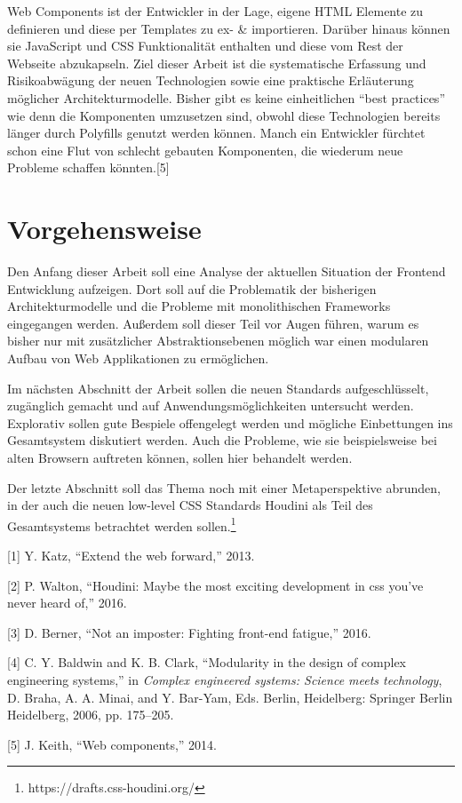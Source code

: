Web Components ist der Entwickler in der Lage, eigene HTML Elemente zu
definieren und diese per Templates zu ex- \& importieren. Darüber hinaus
können sie JavaScript und CSS Funktionalität enthalten und diese vom
Rest der Webseite abzukapseln. Ziel dieser Arbeit ist die systematische
Erfassung und Risikoabwägung der neuen Technologien sowie eine
praktische Erläuterung möglicher Architekturmodelle. Bisher gibt es
keine einheitlichen ``best practices'' wie denn die Komponenten
umzusetzen sind, obwohl diese Technologien bereits länger durch
Polyfills genutzt werden können. Manch ein Entwickler fürchtet schon
eine Flut von schlecht gebauten Komponenten, die wiederum neue Probleme
schaffen könnten.{[}5{]}

\section{Vorgehensweise}\label{vorgehensweise}

Den Anfang dieser Arbeit soll eine Analyse der aktuellen Situation der
Frontend Entwicklung aufzeigen. Dort soll auf die Problematik der
bisherigen Architekturmodelle und die Probleme mit monolithischen
Frameworks eingegangen werden. Außerdem soll dieser Teil vor Augen
führen, warum es bisher nur mit zusätzlicher Abstraktionsebenen möglich
war einen modularen Aufbau von Web Applikationen zu ermöglichen.

Im nächsten Abschnitt der Arbeit sollen die neuen Standards
aufgeschlüsselt, zugänglich gemacht und auf Anwendungsmöglichkeiten
untersucht werden. Explorativ sollen gute Bespiele offengelegt werden
und mögliche Einbettungen ins Gesamtsystem diskutiert werden. Auch die
Probleme, wie sie beispielsweise bei alten Browsern auftreten können,
sollen hier behandelt werden.

Der letzte Abschnitt soll das Thema noch mit einer Metaperspektive
abrunden, in der auch die neuen low-level CSS Standards Houdini als Teil
des Gesamtsystems betrachtet werden sollen.\footnote{https://drafts.css-houdini.org/}

\hypertarget{refs}{}
\hypertarget{ref-Katz2013}{}
{[}1{]} Y. Katz, ``Extend the web forward,'' 2013.

\hypertarget{ref-Walton2016}{}
{[}2{]} P. Walton, ``Houdini: Maybe the most exciting development in css
you've never heard of,'' 2016.

\hypertarget{ref-Berner2016}{}
{[}3{]} D. Berner, ``Not an imposter: Fighting front-end fatigue,''
2016.

\hypertarget{ref-Baldwin2006}{}
{[}4{]} C. Y. Baldwin and K. B. Clark, ``Modularity in the design of
complex engineering systems,'' in \emph{Complex engineered systems:
Science meets technology}, D. Braha, A. A. Minai, and Y. Bar-Yam, Eds.
Berlin, Heidelberg: Springer Berlin Heidelberg, 2006, pp. 175--205.

\hypertarget{ref-Keith2014}{}
{[}5{]} J. Keith, ``Web components,'' 2014.
